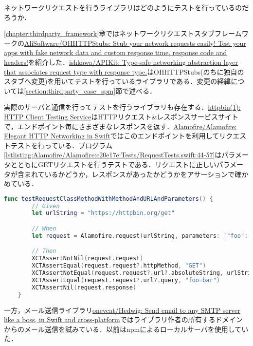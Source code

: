 ネットワークリクエストを行うライブラリはどのようにテストを行っているのだろうか．

\ref{chapter:thirdparty_framework}章ではネットワークリクエストスタブフレームワークの\href{https://github.com/AliSoftware/OHHTTPStubs}{AliSoftware/OHHTTPStubs: Stub your network requests easily! Test your apps with fake network data and custom response time, response code and headers!}を紹介した．\href{https://github.com/ishkawa/APIKit}{ishkawa/APIKit: Type-safe networking abstraction layer that associates request type with response type.}はOHHTTPStubs(のちに独自のスタブへ変更)を用いてテストを行っているライブラリである．変更の経緯については\ref{section:thirdparty_case_spm}節で述べる．

実際のサーバと通信を行ってテストを行うライブラリも存在する．\href{https://httpbin.org/}{httpbin(1): HTTP Client Testing Service}はHTTPリクエスト\&レスポンスサービスサイトで，エンドポイント毎にさまざまなレスポンスを返す．\href{https://github.com/Alamofire/Alamofire}{Alamofire/Alamofire: Elegant HTTP Networking in Swift}ではこのエンドポイントを利用してリクエストテストを行っている．プログラム\ref{lstlisting:Alamofire/Alamofire:c20e17e:Tests/RequestTests.swift:44-57}はパラメータとともにGETリクエストを行うテストである．リクエストに正しいパラメータが含まれているかどうか，レスポンスがあったかどうかをアサーションで確かめている．

\begin{lstlisting}[language=swift,caption=\href{https://github.com/Alamofire/Alamofire/blob/c20e17e38eadefbc6d77332290e5b7e84eb15932/Tests/RequestTests.swift}{Alamofireでのパラメータ付きGETリクエストテスト},label=lstlisting:Alamofire/Alamofire:c20e17e:Tests/RequestTests.swift:44-57,firstnumber=44]
    func testRequestClassMethodWithMethodAndURLAndParameters() {
        // Given
        let urlString = "https://httpbin.org/get"

        // When
        let request = Alamofire.request(urlString, parameters: ["foo": "bar"])

        // Then
        XCTAssertNotNil(request.request)
        XCTAssertEqual(request.request?.httpMethod, "GET")
        XCTAssertNotEqual(request.request?.url?.absoluteString, urlString)
        XCTAssertEqual(request.request?.url?.query, "foo=bar")
        XCTAssertNil(request.response)
    }
\end{lstlisting}

一方，メール送信ライブラリ\href{https://github.com/onevcat/Hedwig}{onevcat/Hedwig: Send email to any SMTP server like a boss, in Swift and cross-platform}ではライブラリ作者の所有するドメインからのメール送信を試みている．以前はnpmによるローカルサーバを使用していた．


